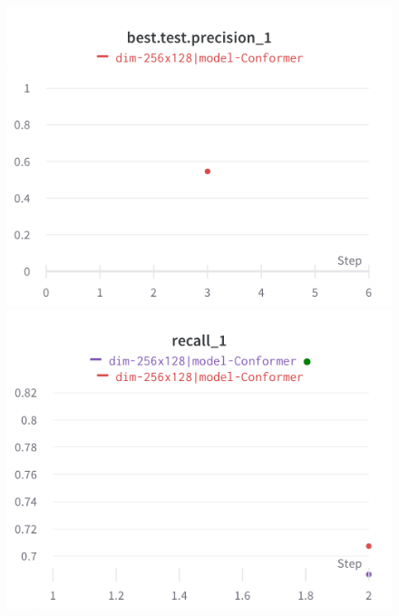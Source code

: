 \documentclass{article}
\begin{document}
\begin{figure}[!htb]
\includegraphics[width=\linewidth]{charts/Section-2-Panel-2-4jiddzy51}
\caption{}
\endminipage\hfill
{}
\includegraphics[width=\linewidth]{charts/Section-2-Panel-3-l0l25dve1}
\caption{}
\endminipage
\end{figure}
\end{document}

